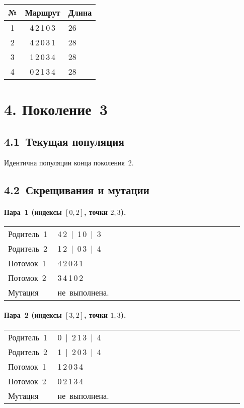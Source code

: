 \documentclass[a4paper,12pt]{article}
\begin{document}
\begin{center}
\begin{tabular}{ccl}
\toprule
№ & Маршрут & Длина\\\midrule
1 & 4\,2\,1\,0\,3 & 26\\
2 & 4\,2\,0\,3\,1 & 28\\
3 & 1\,2\,0\,3\,4 & 28\\
4 & 0\,2\,1\,3\,4 & 28\\
\bottomrule
\end{tabular}
\end{center}

\section*{4. Поколение 3}

\subsection*{4.1 Текущая популяция}

Идентична популяции конца поколения 2.

\subsection*{4.2 Скрещивания и мутации}

\paragraph{Пара 1 (индексы $[0,2]$, точки $2,3$).}
\begin{longtable}{@{}p{0.18\linewidth}p{0.75\linewidth}@{}}
Родитель 1 & 4\,2 \,|\, 1\,0 \,|\, 3\\
Родитель 2 & 1\,2 \,|\, 0\,3 \,|\, 4\\
Потомок 1  & 4\,2\,0\,3\,1\\
Потомок 2  & 3\,4\,1\,0\,2\\
Мутация    & не выполнена.\\
\end{longtable}

\paragraph{Пара 2 (индексы $[3,2]$, точки $1,3$).}
\begin{longtable}{@{}p{0.18\linewidth}p{0.75\linewidth}@{}}
Родитель 1 & 0 \,|\, 2\,1\,3 \,|\, 4\\
Родитель 2 & 1 \,|\, 2\,0\,3 \,|\, 4\\
Потомок 1  & 1\,2\,0\,3\,4\\
Потомок 2  & 0\,2\,1\,3\,4\\
Мутация    & не выполнена.\\
\end{longtable}
\end{document}
